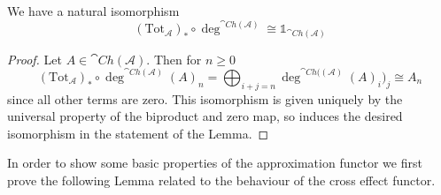 \begin{lem}[label=lem:compIdTot]
    We have a natural isomorphism
    \begin{equation*}
        (\text{Tot}_\mathcal{A})_*\circ \deg^{\cat{Ch}(\mathcal{A})} \cong \mathbb{1}_{\cat{Ch}(\mathcal{A})}
    \end{equation*}
\end{lem}
\begin{proof}
    Let $A \in \cat{Ch}(\mathcal{A})$. Then for $n \geq 0$
    \begin{equation*}
        (\text{Tot}_\mathcal{A})_*\circ \deg^{\cat{Ch}(\mathcal{A})}(A)_n = \bigoplus_{i+j=n}\deg^{\cat{Ch}((\mathcal{A})}(A)_i)_j \cong A_n
    \end{equation*}
    since all other terms are zero. This isomorphism is given uniquely by the universal property of the biproduct and zero map, so induces the desired isomorphism in the statement of the Lemma.
\end{proof}

In order to show some basic properties of the approximation functor we first prove the following Lemma related to the behaviour of the cross effect functor.

